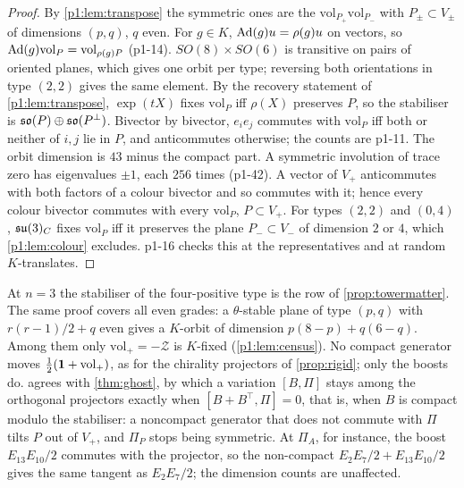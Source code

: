 \begin{proof}
By \cref{p1:lem:transpose} the symmetric ones are the $\mathrm{vol}_{P_+}\mathrm{vol}_{P_-}$ with $P_\pm\subset V_\pm$ of dimensions $(p,q)$, $q$ even. For $g\in K$,
$\operatorname{Ad}(g)u=\rho(g)u$ on vectors, so $\operatorname{Ad}(g)\mathrm{vol}_P=\mathrm{vol}_{\rho(g)P}$ (p1-14). $SO(8)\times SO(6)$ is transitive on pairs of oriented planes, which gives one orbit per
type; reversing both orientations in type $(2,2)$ gives the same element. By the recovery statement of \cref{p1:lem:transpose}, $\exp(tX)$ fixes $\mathrm{vol}_P$ iff $\rho(X)$
preserves $P$, so the stabiliser is $\mathfrak{so}(P)\oplus\mathfrak{so}(P^\perp)$. Bivector by bivector, $e_ie_j$ commutes with $\mathrm{vol}_P$ iff both or neither of $i,j$ lie in $P$, and
anticommutes otherwise; the counts are p1-11. The orbit dimension is $43$ minus the compact part. A symmetric involution of trace zero has eigenvalues $\pm1$, each $256$
times (p1-42). A vector of $V_+$ anticommutes with both factors of a colour bivector and so commutes with it; hence every colour bivector commutes with every $\mathrm{vol}_P$, $P\subset V_+$. For types $(2,2)$ and $(0,4)$,
$\mathfrak{su}(3)_C$ fixes $\mathrm{vol}_P$ iff it preserves the plane $P_-\subset V_-$ of dimension $2$ or $4$, which \cref{p1:lem:colour} excludes. p1-16 checks this at the
representatives and at random $K$-translates.
\end{proof}

At $n=3$ the stabiliser of the four-positive type is the row of \cref{prop:towermatter}. The same proof covers all even grades: a $\theta$-stable plane of type $(p,q)$
with $r(r-1)/2+q$ even gives a $K$-orbit of dimension $p(8-p)+q(6-q)$. Among them only $\mathrm{vol}_+=-\mathcal Z$ is $K$-fixed (\cref{p1:lem:census}). No compact generator moves
$\tfrac12(\mathbf 1+\mathrm{vol}_+)$, as for the chirality projectors of \cref{prop:rigid}; only the boosts do.  agrees with \cref{thm:ghost}, by which a
variation $[B,\Pi]$ stays among the orthogonal projectors exactly when $[B+B^{\!\top},\Pi]=0$, that is, when $B$ is compact modulo the stabiliser: a noncompact
generator that does not commute with $\Pi$ tilts $P$ out of $V_+$, and $\Pi_P$ stops being symmetric. At $\Pi_A$, for instance, the boost $E_{13}E_{10}/2$ commutes
with the projector, so the non-compact $E_2E_7/2+E_{13}E_{10}/2$ gives the same tangent as $E_2E_7/2$; the dimension counts are unaffected.

